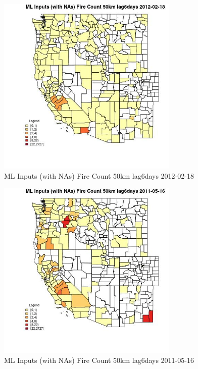 \begin{figure} 
\centering  
\includegraphics[width=0.77\textwidth]{Code_Outputs/Report_ML_input_PM25_Step4_part_f_de_duplicated_aves_prioritize_24hr_obswNAs_CountyFire_Count_50km_lag6daysMean2012-02-18.jpg} 
\caption{\label{fig:Report_ML_input_PM25_Step4_part_f_de_duplicated_aves_prioritize_24hr_obswNAsCountyFire_Count_50km_lag6daysMean2012-02-18}ML Inputs (with NAs) Fire Count 50km lag6days 2012-02-18} 
\end{figure} 
 

\begin{figure} 
\centering  
\includegraphics[width=0.77\textwidth]{Code_Outputs/Report_ML_input_PM25_Step4_part_f_de_duplicated_aves_prioritize_24hr_obswNAs_CountyFire_Count_50km_lag6daysMean2011-05-16.jpg} 
\caption{\label{fig:Report_ML_input_PM25_Step4_part_f_de_duplicated_aves_prioritize_24hr_obswNAsCountyFire_Count_50km_lag6daysMean2011-05-16}ML Inputs (with NAs) Fire Count 50km lag6days 2011-05-16} 
\end{figure} 
 

